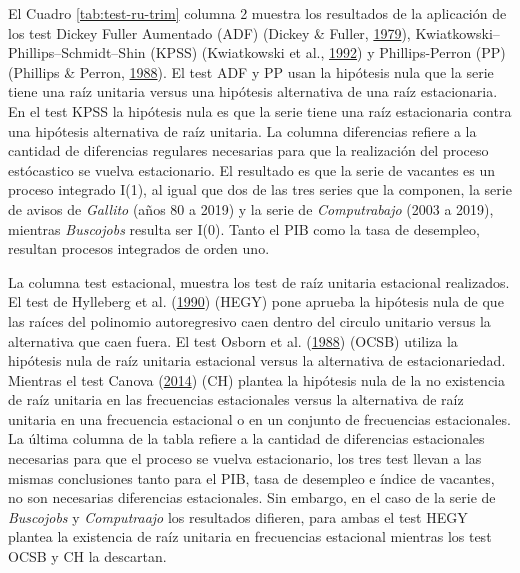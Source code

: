 \documentclass[12pt,oneside]{reedthesis}
\begin{document}
El Cuadro \ref{tab:test-ru-trim} columna 2 muestra los resultados de la aplicación de los test Dickey Fuller Aumentado (ADF) (Dickey \& Fuller, \protect\hyperlink{ref-DickeyFuller1979}{1979}), Kwiatkowski--Phillips--Schmidt--Shin (KPSS) (Kwiatkowski et al., \protect\hyperlink{ref-KPSS1992}{1992}) y Phillips-Perron (PP) (Phillips \& Perron, \protect\hyperlink{ref-PhillipsPerron1988}{1988}). El test ADF y PP usan la hipótesis nula que la serie tiene una raíz unitaria versus una hipótesis alternativa de una raíz estacionaria. En el test KPSS la hipótesis nula es que la serie tiene una raíz estacionaria contra una hipótesis alternativa de raíz unitaria. La columna diferencias refiere a la cantidad de diferencias regulares necesarias para que la realización del proceso estócastico se vuelva estacionario. El resultado es que la serie de vacantes es un proceso integrado I(1), al igual que dos de las tres series que la componen, la serie de avisos de \emph{Gallito} (años 80 a 2019) y la serie de \emph{Computrabajo} (2003 a 2019), mientras \emph{Buscojobs} resulta ser I(0). Tanto el PIB como la tasa de desempleo, resultan procesos integrados de orden uno.

La columna test estacional, muestra los test de raíz unitaria estacional realizados. El test de Hylleberg et al. (\protect\hyperlink{ref-hegy1990}{1990}) (HEGY) pone aprueba la hipótesis nula de que las raíces del polinomio autoregresivo caen dentro del circulo unitario versus la alternativa que caen fuera. El test Osborn et al. (\protect\hyperlink{ref-Osborn1988}{1988}) (OCSB) utiliza la hipótesis nula de raíz unitaria estacional versus la alternativa de estacionariedad. Mientras el test Canova (\protect\hyperlink{ref-Canova1995}{2014}) (CH) plantea la hipótesis nula de la no existencia de raíz unitaria en las frecuencias estacionales versus la alternativa de raíz unitaria en una frecuencia estacional o en un conjunto de frecuencias estacionales. La última columna de la tabla refiere a la cantidad de diferencias estacionales necesarias para que el proceso se vuelva estacionario, los tres test llevan a las mismas conclusiones tanto para el PIB, tasa de desempleo e índice de vacantes, no son necesarias diferencias estacionales. Sin embargo, en el caso de la serie de \emph{Buscojobs} y \emph{Computraajo} los resultados difieren, para ambas el test HEGY plantea la existencia de raíz unitaria en frecuencias estacional mientras los test OCSB y CH la descartan.
\end{document}
